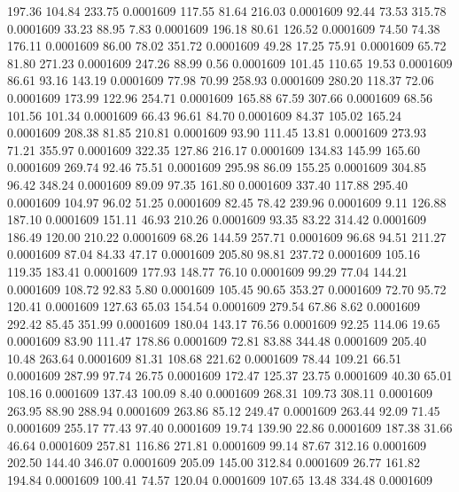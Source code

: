  197.36  104.84  233.75   0.0001609
 117.55   81.64  216.03   0.0001609
  92.44   73.53  315.78   0.0001609
  33.23   88.95    7.83   0.0001609
 196.18   80.61  126.52   0.0001609
  74.50   74.38  176.11   0.0001609
  86.00   78.02  351.72   0.0001609
  49.28   17.25   75.91   0.0001609
  65.72   81.80  271.23   0.0001609
 247.26   88.99    0.56   0.0001609
 101.45  110.65   19.53   0.0001609
  86.61   93.16  143.19   0.0001609
  77.98   70.99  258.93   0.0001609
 280.20  118.37   72.06   0.0001609
 173.99  122.96  254.71   0.0001609
 165.88   67.59  307.66   0.0001609
  68.56  101.56  101.34   0.0001609
  66.43   96.61   84.70   0.0001609
  84.37  105.02  165.24   0.0001609
 208.38   81.85  210.81   0.0001609
  93.90  111.45   13.81   0.0001609
 273.93   71.21  355.97   0.0001609
 322.35  127.86  216.17   0.0001609
 134.83  145.99  165.60   0.0001609
 269.74   92.46   75.51   0.0001609
 295.98   86.09  155.25   0.0001609
 304.85   96.42  348.24   0.0001609
  89.09   97.35  161.80   0.0001609
 337.40  117.88  295.40   0.0001609
 104.97   96.02   51.25   0.0001609
  82.45   78.42  239.96   0.0001609
   9.11  126.88  187.10   0.0001609
 151.11   46.93  210.26   0.0001609
  93.35   83.22  314.42   0.0001609
 186.49  120.00  210.22   0.0001609
  68.26  144.59  257.71   0.0001609
  96.68   94.51  211.27   0.0001609
  87.04   84.33   47.17   0.0001609
 205.80   98.81  237.72   0.0001609
 105.16  119.35  183.41   0.0001609
 177.93  148.77   76.10   0.0001609
  99.29   77.04  144.21   0.0001609
 108.72   92.83    5.80   0.0001609
 105.45   90.65  353.27   0.0001609
  72.70   95.72  120.41   0.0001609
 127.63   65.03  154.54   0.0001609
 279.54   67.86    8.62   0.0001609
 292.42   85.45  351.99   0.0001609
 180.04  143.17   76.56   0.0001609
  92.25  114.06   19.65   0.0001609
  83.90  111.47  178.86   0.0001609
  72.81   83.88  344.48   0.0001609
 205.40   10.48  263.64   0.0001609
  81.31  108.68  221.62   0.0001609
  78.44  109.21   66.51   0.0001609
 287.99   97.74   26.75   0.0001609
 172.47  125.37   23.75   0.0001609
  40.30   65.01  108.16   0.0001609
 137.43  100.09    8.40   0.0001609
 268.31  109.73  308.11   0.0001609
 263.95   88.90  288.94   0.0001609
 263.86   85.12  249.47   0.0001609
 263.44   92.09   71.45   0.0001609
 255.17   77.43   97.40   0.0001609
  19.74  139.90   22.86   0.0001609
 187.38   31.66   46.64   0.0001609
 257.81  116.86  271.81   0.0001609
  99.14   87.67  312.16   0.0001609
 202.50  144.40  346.07   0.0001609
 205.09  145.00  312.84   0.0001609
  26.77  161.82  194.84   0.0001609
 100.41   74.57  120.04   0.0001609
 107.65   13.48  334.48   0.0001609
